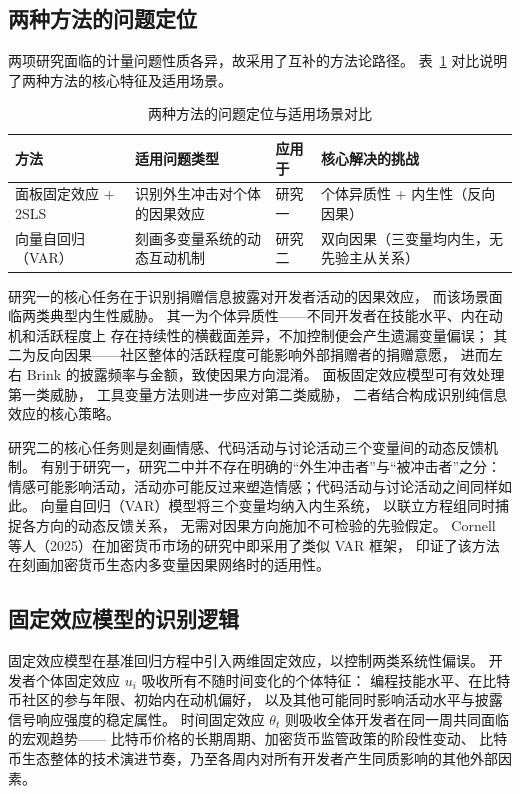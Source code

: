 \documentclass[
    type = master, %
    degree = professional,        %
    decl-page,  %
    twoside,                %
    fontset = fandol %
  ]{njuthesis}
\begin{document}
\subsection{两种方法的问题定位}

两项研究面临的计量问题性质各异，故采用了互补的方法论路径。
表~\ref{tab:method-comparison} 对比说明了两种方法的核心特征及适用场景。

\begin{table}[htbp]
    \centering
    \caption{两种方法的问题定位与适用场景对比}
    \label{tab:method-comparison}
    \begin{tabularx}{\textwidth}{lXXX}
        \toprule
        方法 & 适用问题类型 & 应用于 & 核心解决的挑战 \\
        \midrule
        面板固定效应 + 2SLS
            & 识别外生冲击对个体的因果效应
            & 研究一
            & 个体异质性 + 内生性（反向因果）\\
        向量自回归（VAR）
            & 刻画多变量系统的动态互动机制
            & 研究二
            & 双向因果（三变量均内生，无先验主从关系）\\
        \bottomrule
    \end{tabularx}
\end{table}

研究一的核心任务在于识别捐赠信息披露对开发者活动的因果效应，
而该场景面临两类典型内生性威胁。
其一为个体异质性——不同开发者在技能水平、内在动机和活跃程度上
存在持续性的横截面差异，不加控制便会产生遗漏变量偏误；
其二为反向因果——社区整体的活跃程度可能影响外部捐赠者的捐赠意愿，
进而左右 Brink 的披露频率与金额，致使因果方向混淆。
面板固定效应模型可有效处理第一类威胁，
工具变量方法则进一步应对第二类威胁，
二者结合构成识别纯信息效应的核心策略。

研究二的核心任务则是刻画情感、代码活动与讨论活动三个变量间的动态反馈机制。
有别于研究一，研究二中并不存在明确的“外生冲击者”与“被冲击者”之分：
情感可能影响活动，活动亦可能反过来塑造情感；代码活动与讨论活动之间同样如此。
向量自回归（VAR）模型将三个变量均纳入内生系统，
以联立方程组同时捕捉各方向的动态反馈关系，
无需对因果方向施加不可检验的先验假定\cite{sims1980macroeconomics}。
Cornell 等人（2025）在加密货币市场的研究中即采用了类似 VAR 框架，
印证了该方法在刻画加密货币生态内多变量因果网络时的适用性\cite{cornell2025vector}。

\subsection{固定效应模型的识别逻辑}

固定效应模型在基准回归方程中引入两维固定效应，以控制两类系统性偏误。
开发者个体固定效应 $u_i$ 吸收所有不随时间变化的个体特征：
编程技能水平、在比特币社区的参与年限、初始内在动机偏好，
以及其他可能同时影响活动水平与披露信号响应强度的稳定属性。
时间固定效应 $\theta_t$ 则吸收全体开发者在同一周共同面临的宏观趋势——
比特币价格的长期周期、加密货币监管政策的阶段性变动、
比特币生态整体的技术演进节奏，乃至各周内对所有开发者产生同质影响的其他外部因素。
\end{document}
